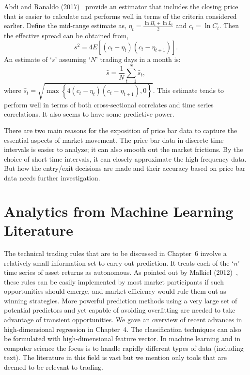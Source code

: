 Abdi and Ranaldo (2017)~\cite{abdi} provide an estimator that includes the closing price that is easier to calculate and performs well in terms of the criteria considered earlier. Define the mid-range estimate as, $\eta_t=\frac{\ln H_t + \ln L_t}{2}$ and $c_t= \ln C_t$. Then the effective spread can be obtained from,
	\begin{equation}\label{eqn:obtainedfrom}
	s^2=4 E\left[ (c_t-\eta_t) (c_t-\eta_{t+1}) \right].
	\end{equation}
An estimate of `$s$' assuming `$N$' trading days in a month is:
	\begin{equation}\label{eqn:monthlycorrected}
	\hat{s}= \dfrac{1}{N} \sum_{t=1}^N \hat{s}_t,
	\end{equation}
where $\hat{s}_t= \sqrt{ \max\left\{ 4(c_t-\eta_t)(c_t-\eta_{t+1}), 0 \right\} }$. This estimate tends to perform well in terms of both cross-sectional correlates and time series correlations. It also seems to have some predictive power. 


There are two main reasons for the exposition of price bar data to capture the essential aspects of market movement. The price bar data in discrete time intervals is easier to analyze; it can also smooth out the market frictions. By the choice of short time intervals, it can closely approximate the high frequency data. But how the entry/exit decisions are made and their accuracy based on price bar data needs further investigation. 



\section{Analytics from Machine Learning Literature}

The technical trading rules that are to be discussed in Chapter~6 involve a relatively small information set to carry out prediction. It treats each of the `$n$' time series of asset returns as autonomous. As pointed out by Malkiel (2012)~\cite{malkiel}, these rules can be easily implemented by most market participants if such opportunities should emerge, and market efficiency would rule them out as winning strategies. More powerful prediction methods using a very large set of potential predictors and yet capable of avoiding overfitting are needed to take advantage of transient opportunities. We gave an overview of recent advances in high-dimensional regression in Chapter~4. The classification techniques can also be formulated with high-dimensional feature vector. In machine learning and in computer science the focus is to handle rapidly different types of data (including text). The literature in this field is vast but we mention only tools that are deemed to be relevant to trading. 


